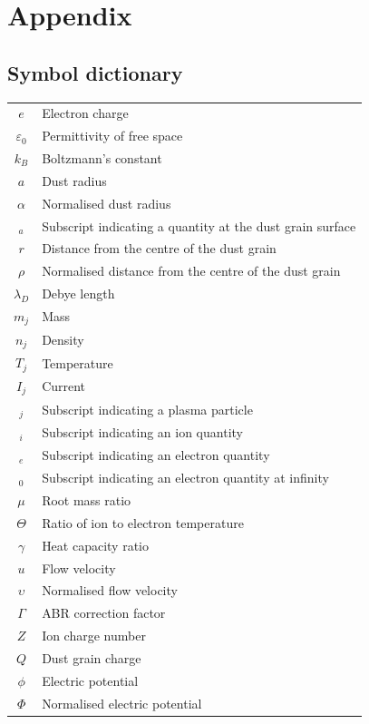\documentclass{article}
\begin{document}
\section{Appendix}

\subsection{Symbol dictionary}
\begin{center}
\begin{tabular}{cl} 

$e$ & Electron charge \\
$\varepsilon_0$ & Permittivity of free space \\
$k_B$ & Boltzmann's constant \\
$a$ & Dust radius\\
$\alpha$ & Normalised dust radius \\
$_a$ & Subscript indicating a quantity at the dust grain surface \\
$r$ & Distance from the centre of the dust grain \\
$\rho$ & Normalised distance from the centre of the dust grain \\
$\lambda_D$ & Debye length \\
$m_j$ & Mass \\
$n_j$ & Density \\
$T_j$ & Temperature \\
$I_j$ & Current \\
$_j$ & Subscript indicating a plasma particle \\
$_i$ & Subscript indicating an ion quantity \\
$_e$ & Subscript indicating an electron quantity \\
$_0$ & Subscript indicating an electron quantity at infinity \\
$\mu$ & Root mass ratio\\
$\Theta$ & Ratio of ion to electron temperature \\
$\gamma$ & Heat capacity ratio \\
$u$ & Flow velocity \\
$\upsilon$ & Normalised flow velocity \\
$\Gamma$ & ABR correction factor \\
$Z$ & Ion charge number \\
$Q$ & Dust grain charge \\
$\phi$ & Electric potential \\
$\Phi$ & Normalised electric potential \\

\end{tabular}
\end{center}
\end{document}
